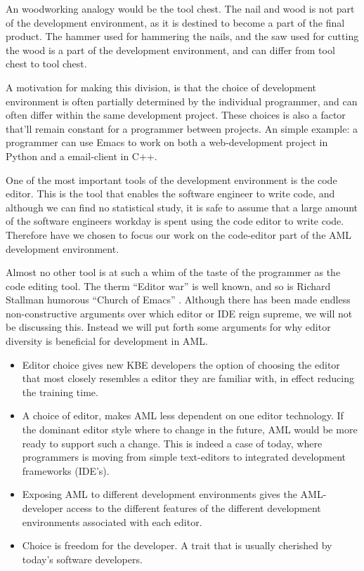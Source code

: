 An woodworking analogy would be the tool chest. The nail and wood is not part of the development environment, as it is destined to become a part of the final product. The hammer used for hammering the nails, and the saw used for cutting the wood is a part of the development environment, and can differ from tool chest to tool chest.

A motivation for making this division, is that the choice of development environment is often partially determined by the individual programmer, and can often differ within the same development project. These choices is also a factor that'll remain constant for a programmer between projects. An simple example: a programmer can use Emacs to work on both a web-development project in Python and a email-client in C++.

One of the most important tools of the development environment is the code editor. This is the tool that enables the software engineer to write code, and although we can find no statistical study, it is safe to assume that a large amount of the software engineers workday is spent using the code editor to write code. Therefore have we chosen to focus our work on the code-editor part of the AML development environment.

Almost no other tool is at such a whim of the taste of the programmer as the code editing tool. The therm “Editor war” is well known, and so is Richard Stallman humorous “Church of Emacs” \citep{stallman}. Although there has been made endless non-constructive arguments over which editor or IDE reign supreme, we will not be discussing this. Instead we will put forth some arguments for why editor diversity is beneficial for development in AML.

\begin{itemize}
  \item Editor choice gives new KBE developers the option of choosing the editor that most closely resembles a editor they are familiar with, in effect reducing the training time.

  \item A choice of editor, makes AML less dependent on one editor technology. If the dominant editor style where to change in the future, AML would be more ready to support such a change. This is indeed a case of today, where programmers is moving from simple text-editors to integrated development frameworks (IDE's).

  \item Exposing AML to different development environments gives the AML-developer access to the different features of the different development environments associated with each editor.

  \item Choice is freedom for the developer. A trait that is usually cherished by today's software developers.
\end{itemize}

